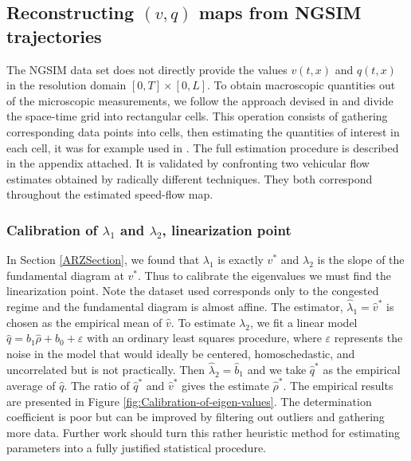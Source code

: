 \documentclass[a4paper, 10pt, conference]{ieeeconf}      %
\begin{document}
\subsection{Reconstructing $(v,q)$ maps from NGSIM trajectories}

The NGSIM data set does not directly provide the values $v(t,x)$ and $q(t,x)$ in the resolution domain $\left[0,T\right]\times\left[0,L\right]$. To obtain macroscopic quantities out of the microscopic measurements, we follow the approach devised in \cite{edie1963discussion} and divide the space-time grid into rectangular cells. This operation consists of gathering corresponding data points into cells, then estimating the quantities of interest in each cell, it was for example used in \cite{Piccoli201532}. The full estimation procedure is described in the appendix attached. It is validated by confronting two vehicular flow estimates obtained by radically different techniques. They both correspond throughout the estimated speed-flow map.\\

\subsubsection{Calibration of $\lambda_{1}$ and $\lambda_{2}$, linearization point}
In Section \ref{ARZSection}, we found that $\lambda_{1}$ is exactly $v^*$ and $\lambda_{2}$ is the slope of the fundamental diagram at $v^*$. Thus to calibrate the eigenvalues we must find the linearization point. Note the dataset used corresponds only to the congested regime and the fundamental diagram is almost affine. The estimator, $\widehat{\lambda}_1=\widehat{v}^*$ is chosen as the empirical mean of $\widehat{v}$. To estimate $\lambda_{2}$, we fit a linear model $\widehat{q}=b_{1}\widehat{\rho}+b_{0}+\varepsilon$ with an ordinary least squares procedure, where $\varepsilon$
represents the noise in the model that would ideally be centered,
homoschedastic, and uncorrelated but is not practically. Then $\widehat{\lambda}_{2}=\widehat{b}_{1}$ and we take $\widehat{q}^*$ as the empirical average of $\widehat{q}$. The ratio of $\widehat{q}^*$ and $\widehat{v}^*$ gives the estimate $\widehat{\rho}^*$.
The empirical results are presented in Figure \ref{fig:Calibration-of-eigen-values}. The determination coefficient is poor but can be improved by filtering out outliers and gathering more data. Further work should turn this rather heuristic method for estimating parameters into a fully justified statistical procedure.
\end{document}
